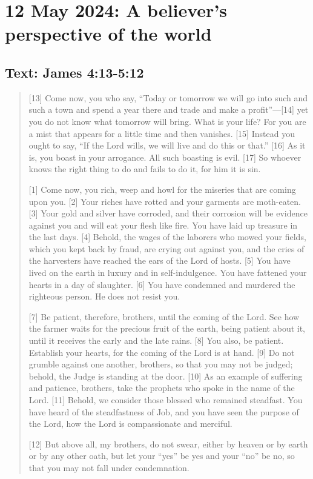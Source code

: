 \setcounter{figure}{0}

\section{12 May 2024: A believer's perspective of the world}
\subsection*{Text: James 4:13-5:12}
  \begin{quote}
    [13] Come now, you who say, “Today or tomorrow we will go into such and
    such a town and spend a year there and trade and make a profit”—[14] yet
    you do not know what tomorrow will bring. What is your life? For you are
    a mist that appears for a little time and then vanishes. [15] Instead you
    ought to say, “If the Lord wills, we will live and do this or that.” [16]
    As it is, you boast in your arrogance. All such boasting is evil. [17] So
    whoever knows the right thing to do and fails to do it, for him it is
    sin.
    
    [1] Come now, you rich, weep and howl for the miseries that are coming
    upon you. [2] Your riches have rotted and your garments are moth-eaten.
    [3] Your gold and silver have corroded, and their corrosion will be
    evidence against you and will eat your flesh like fire. You have laid up
    treasure in the last days. [4] Behold, the wages of the laborers who
    mowed your fields, which you kept back by fraud, are crying out against
    you, and the cries of the harvesters have reached the ears of the Lord of
    hosts. [5] You have lived on the earth in luxury and in self-indulgence.
    You have fattened your hearts in a day of slaughter. [6] You have
    condemned and murdered the righteous person. He does not resist you.
    
    [7] Be patient, therefore, brothers, until the coming of the Lord. See
    how the farmer waits for the precious fruit of the earth, being patient
    about it, until it receives the early and the late rains. [8] You also,
    be patient. Establish your hearts, for the coming of the Lord is at hand.
    [9] Do not grumble against one another, brothers, so that you may not be
    judged; behold, the Judge is standing at the door. [10] As an example of
    suffering and patience, brothers, take the prophets who spoke in the name
    of the Lord. [11] Behold, we consider those blessed who remained
    steadfast. You have heard of the steadfastness of Job, and you have seen
    the purpose of the Lord, how the Lord is compassionate and merciful.
    
    [12] But above all, my brothers, do not swear, either by heaven or by
    earth or by any other oath, but let your “yes” be yes and your “no” be
    no, so that you may not fall under condemnation.
  \end{quote}
